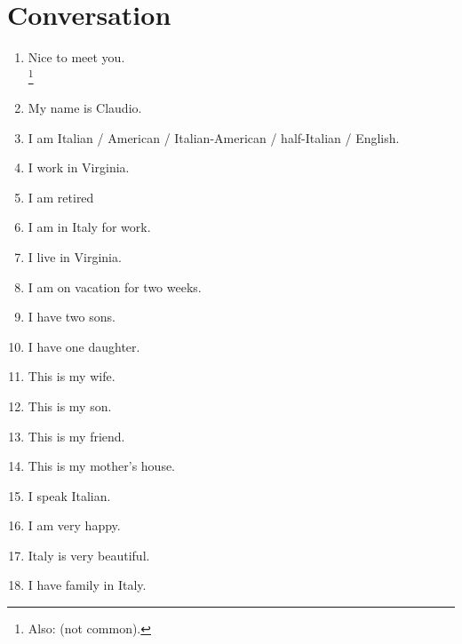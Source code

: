 \section{Conversation} \label{0221-Conversation}
\begin{enumerate}
    \item Nice to meet you. \\
    \footnote{Also:  (not common).}
    \item My name is Claudio. \\
    \item I am Italian / American / Italian-American / half-Italian / English. \\
    \item I work in Virginia. \\
    \item I am retired \\
    \item I am in Italy for work. \\
    \item I live in Virginia. \\
    \item I am on vacation for two weeks. \\
    \item I have two sons. \\
    \item I have one daughter. \\
    \item This is my wife. \\
    \item This is my son. \\
    \item This is my friend. \\
    \item This is my mother's house. \\
    \item I speak Italian. \\
    \item I am very happy. \\
    \item Italy is very beautiful. \\
    \item I have family in Italy. \\
\end{enumerate}


